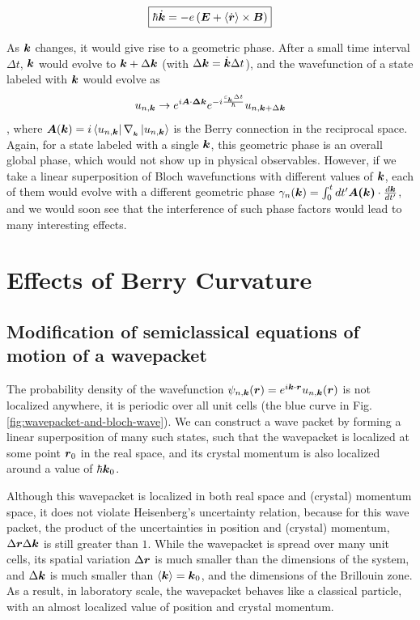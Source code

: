 \documentclass{revtex4-2}
\renewcommand\vec[1]{\ensuremath\boldsymbol{#1}} %
\begin{document}
\begin{equation} \label{Eq:evolution-of-k}
	\boxed{\hbar \dot{\vec{k}} = -e\left(\vec{E} + \langle\dot{\vec{r}}\rangle \times \vec{B} \right)}
\end{equation}

As $\vec{k}$ changes, it would give rise to a geometric phase. After a small time interval $\Delta t$, $\vec{k}$ would evolve to $\vec{k} + \Delta \vec{k}$ (with $\Delta \vec{k} = \dot{\vec{k}} \Delta t$), and the wavefunction of a state labeled with $\vec{k}$ would evolve as 
\begin{equation}\label{Eq:u-n-k-time-evolution}
	u_{n, \vec{k}} \rightarrow e^{i \vec{A}\cdot \vec{\Delta{k}}} e^{-i \frac{\varepsilon_{_{\vec{k}}} \Delta t}{\hbar}} u_{n, \vec{k}+\Delta \vec{k}}
\end{equation}, where $\vec{A}(\vec{k})=i \bra{u_{n,\vec{k}}}\nabla_{_{\vec{k}}} \ket{u_{n,\vec{k}}}$ is the Berry connection in the reciprocal space. Again, for a state labeled with a single $\vec{k}$, this geometric phase is an overall global phase, which would not show up in physical observables. However, if we take a linear superposition of Bloch wavefunctions with different values of $\vec{k}$, each of them would evolve with a different geometric phase $\gamma_n (\vec{k}) = \int_{0}^{t} dt' \vec{A(\vec{k})} \cdot \frac{d \vec{k}}{dt'} $, and we would soon see that the interference of such phase factors would lead to many interesting effects.
\section{Effects of Berry Curvature}
\subsection{Modification of semiclassical equations of motion of a wavepacket}
The probability density of the wavefunction $\psi_{n, \vec{k}} (\vec{r}) = e^{i \vec{k}\cdot \vec{r}} u_{n,\vec{k}} (\vec{r})$ is not localized anywhere, it is periodic over all unit cells (the blue curve in Fig. \ref{fig:wavepacket-and-bloch-wave}). We can construct a wave packet by forming a linear superposition of many such states, such that the wavepacket is localized at some point $\vec{r}_0$ in the real space, and its crystal momentum is also localized around a value of $\hbar \vec{k}_0$.

Although this wavepacket is localized in both real space and (crystal) momentum space, it does not violate Heisenberg's uncertainty relation, because for this wave packet, the product of the uncertainties in position and (crystal) momentum, $\Delta \vec{r} \Delta \vec{k}$ is still greater than $1$. While the wavepacket is spread over many unit cells, its spatial variation $\Delta \vec{r}$ is much smaller than the dimensions of the system, and $\Delta \vec{k}$ is much smaller than $\langle \vec{k} \rangle = \vec{k}_0$, and the dimensions of the Brillouin zone. As a result, in laboratory scale, the wavepacket behaves like a classical particle, with an almost localized value of position and crystal momentum.
\end{document}
